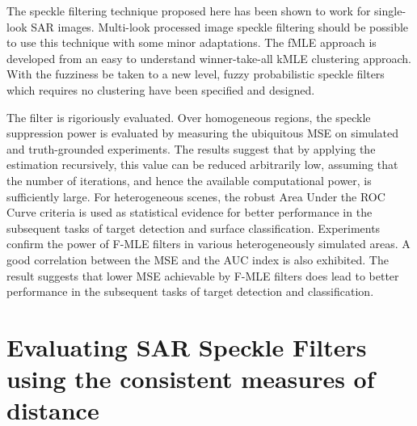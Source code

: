 The speckle filtering technique proposed here has been shown to work for single-look SAR images. 
Multi-look processed image speckle filtering should be possible to use this technique with some minor adaptations. 
The fMLE approach is developed from an easy to understand winner-take-all kMLE clustering approach. %
With the fuzziness be taken to a new level, fuzzy probabilistic speckle filters which requires no clustering have been specified and designed.

The filter is rigoriously evaluated.
Over homogeneous regions, the speckle suppression power is
evaluated by measuring the ubiquitous MSE on simulated and truth-grounded experiments. 
The results suggest that by applying the estimation recursively, this value can be reduced arbitrarily low, assuming that the number of iterations, and hence the available computational power, is sufficiently large.
For heterogeneous scenes, the robust Area Under the ROC Curve criteria is used as
statistical evidence for better performance in the subsequent tasks of target detection
and surface classification. 
Experiments confirm the power of F-MLE filters in various
heterogeneously simulated areas. 
A good correlation between the MSE and the AUC index is also exhibited. 
The result suggests that lower MSE achievable by F-MLE filters does lead to better performance in the subsequent tasks of target detection and classification.

%

\section{Evaluating SAR Speckle Filters using the consistent measures of distance}

